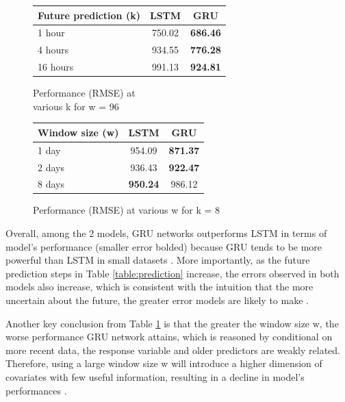 \documentclass[11pt]{article}
\begin{document}
\begin{figure}[ht]
    \begin{minipage}{0.45\textwidth}
        \centering
        \begin{tabular}{|l|c|c|}
            \hline
            Future prediction (k) & LSTM & GRU \\
            \hline
            1 hour & 750.02 & \textbf{686.46} \\
            4 hours & 934.55 & \textbf{776.28} \\
            16 hours & 991.13 & \textbf{924.81} \\
            \hline
        \end{tabular}
        \caption{Performance (RMSE) at \\ various k for w = 96}
        \label{table:prediction}
    \end{minipage}%
    \begin{minipage}{0.45\textwidth}
        \centering
        \begin{tabular}{|l|c|c|}
            \hline
            Window size (w) & LSTM & GRU \\
            \hline
            1 day & 954.09 & \textbf{871.37} \\
            2 days & 936.43 & \textbf{922.47} \\
            8 days & \textbf{950.24} & 986.12 \\
            \hline
        \end{tabular}
        \caption{Performance (RMSE) at various w for k = 8}
        \label{table:window}
    \end{minipage}
\end{figure}



Overall, among the 2 models, GRU networks outperforms LSTM in terms of model's performance (smaller error bolded) because GRU tends to be more powerful than LSTM in small datasets \cite{Chung-GRU}. More importantly, as the future prediction steps in Table \ref{table:prediction} increase, the errors observed in both models also increase, which is consistent with the intuition that the more uncertain about the future, the greater error models are likely to make \cite{Tran-NBeats}.


Another key conclusion from Table \ref{table:window} is that the greater the window size w, the worse performance GRU network attains, which is reasoned by conditional on more recent data, the response variable and older predictors are weakly related. Therefore, using a large window size w will introduce a higher dimension of covariates with few useful information, resulting in a decline in model's performances \cite{Tran-NBeats}. 
\end{document}
